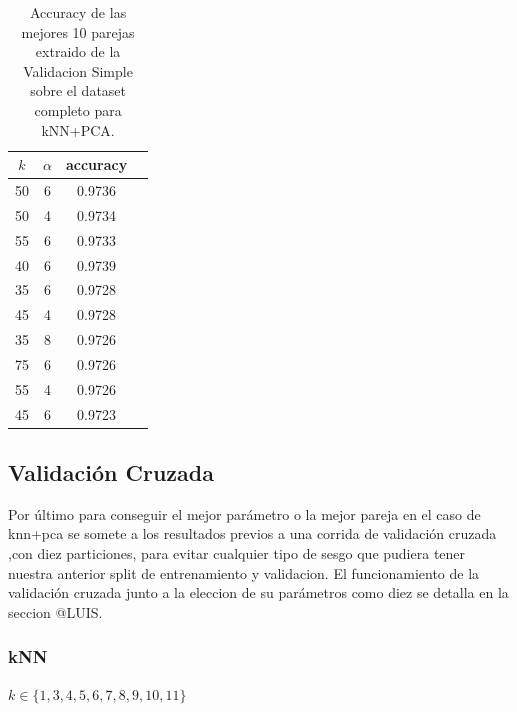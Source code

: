 \documentclass[a4paper,10pt]{article}
\begin{document}
\begin{table}[h!]
    \begin{center}
        \begin{tabular}{|c|c|c|c|}
        \hline
        \textbf{$k$} & \textbf{$\alpha$} & \textbf{accuracy} \\
        \hline
        50 & 6 & 0.9736\\
        50 & 4 & 0.9734\\
        55 & 6 & 0.9733\\
        40 & 6 & 0.9739\\
        35 & 6 & 0.9728\\
        45 & 4 & 0.9728\\
        35 & 8 & 0.9726\\
        75 & 6 & 0.9726\\
        55 & 4 & 0.9726\\
        45 & 6 & 0.9723\\
        
        \hline
        \end{tabular}
        \caption{Accuracy de las mejores 10 parejas extraido de la Validacion Simple sobre el dataset completo para kNN+PCA.}
        \label{knnpca_valSimple_table}
    \end{center}
\end{table}

\subsection{Validación Cruzada}

Por último para conseguir el mejor parámetro o la mejor pareja en el caso de knn+pca se somete a los resultados previos a una corrida de validación cruzada ,con diez particiones, para evitar cualquier tipo de sesgo que pudiera tener nuestra anterior split de entrenamiento y validacion. 
El funcionamiento de la validación cruzada junto a la eleccion de su parámetros como diez se detalla en la seccion @LUIS.

\subsubsection{kNN}


$ k \in \{1,3,4,5,6,7,8,9,10,11\}$
\end{document}
